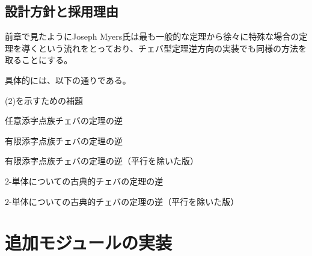 \documentclass[a4paper,12pt]{bxjsbook}
\newlength{\customindent}
\newenvironment{body}{
  \par
  \begingroup
  \setlength{\leftskip}{\customindent}
  \setlength{\rightskip}{0pt}
  \setlength{\parindent}{1em}
  \setlength{\displayindent}{\customindent}
  \setlength{\displaywidth}{\dimexpr\linewidth-\customindent\relax}
}{
  \par
  \endgroup
}
\theoremstyle{theorem}
\begin{document}
    \subsection{設計方針と採用理由}
    \begin{body}
        \indent 前章で見たようにJoseph Myers氏は最も一般的な定理から徐々に特殊な場合の定理を導くという流れをとっており、チェバ型定理逆方向の実装でも同様の方法を取ることにする。

        \indent 具体的には、以下の通りである。

        \begin{bodyenumerate}
            \item (2)を示すための補題
            \item 任意添字点族チェバの定理の逆
            \item 有限添字点族チェバの定理の逆
            \item 有限添字点族チェバの定理の逆（平行を除いた版）
            \item $2$-単体についての古典的チェバの定理の逆
            \item $2$-単体についての古典的チェバの定理の逆（平行を除いた版）
        \end{bodyenumerate}


    \end{body}


    \section{追加モジュールの実装}
\end{document}
